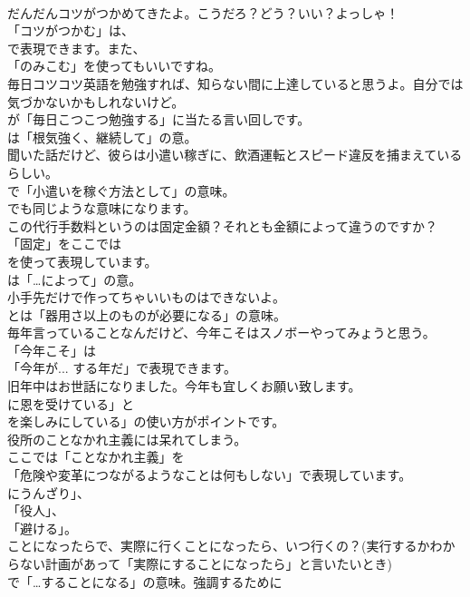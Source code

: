 \documentclass[8pt]{extreport}
\begin{document}
\begin{CJK}{UTF8}{min}
\\	だんだんコツがつかめてきたよ。こうだろ？どう？いい？よっしゃ！ 
\\	「コツがつかむ」は、
\\	で表現できます。また、
\\	「のみこむ」を使ってもいいですね。	
\\	毎日コツコツ英語を勉強すれば、知らない間に上達していると思うよ。自分では気づかないかもしれないけど。 
\\	が「毎日こつこつ勉強する」に当たる言い回しです。
\\	は「根気強く、継続して」の意。	
\\	聞いた話だけど、彼らは小遣い稼ぎに、飲酒運転とスピード違反を捕まえているらしい。 
\\	で「小遣いを稼ぐ方法として」の意味。
\\	でも同じような意味になります。	
\\	この代行手数料というのは固定金額？それとも金額によって違うのですか？ 
\\	「固定」をここでは 
\\	を使って表現しています。
\\	は「…によって」の意。	
\\	小手先だけで作ってちゃいいものはできないよ。 
\\	とは「器用さ以上のものが必要になる」の意味。	
\\	毎年言っていることなんだけど、今年こそはスノボーやってみょうと思う。 
\\	「今年こそ」は
\\	「今年が... する年だ」で表現できます。	
\\	旧年中はお世話になりました。今年も宜しくお願い致します。 
\\	に恩を受けている」と
\\	を楽しみにしている」の使い方がポイントです。	
\\	役所のことなかれ主義には呆れてしまう。 
\\	ここでは「ことなかれ主義」を
\\	「危険や変革につながるようなことは何もしない」で表現しています。
\\	にうんざり」、
\\	「役人」、
\\	「避ける」。	
\\	ことになったらで、実際に行くことになったら、いつ行くの？(実行するかわからない計画があって「実際にすることになったら」と言いたいとき) 
\\	で「…することになる」の意味。強調するために

\end{CJK}
\end{document}
